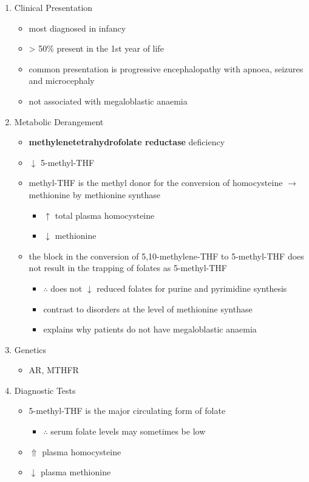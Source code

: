 \documentclass[12pt]{scrartcl}
\begin{document}
\begin{enumerate}
\item Clinical Presentation
\label{sec:org2fc5f35}
\begin{itemize}
\item most diagnosed in infancy
\item \textgreater{} 50\% present in the 1st year of life
\item common presentation is progressive encephalopathy with apnoea,
seizures and microcephaly
\item not associated with megaloblastic anaemia
\end{itemize}

\item Metabolic Derangement
\label{sec:orgcab1d4a}
\begin{itemize}
\item \textbf{methylenetetrahydrofolate reductase} deficiency
\end{itemize}
\begin{itemize}
\item \(\downarrow\) 5-methyl-THF
\item methyl-THF is the methyl donor for the conversion of homocysteine
\(\to\) methionine by methionine synthase
\begin{itemize}
\item \(\uparrow\) total plasma homocysteine
\item \(\downarrow\) methionine
\end{itemize}
\item the block in the conversion of 5,10-methylene-THF to 5-methyl-THF does not
result in the trapping of folates as 5-methyl-THF
\begin{itemize}
\item \(\therefore\) does not \(\downarrow\) reduced folates for purine and
pyrimidine synthesis
\item contrast to disorders at the level of methionine synthase
\item explains why patients do not have megaloblastic anaemia
\end{itemize}
\end{itemize}

\item Genetics
\label{sec:org835047e}
\begin{itemize}
\item AR, MTHFR
\end{itemize}

\item Diagnostic Tests
\label{sec:org97e2616}
\begin{itemize}
\item 5-methyl-THF is the major circulating form of folate
\begin{itemize}
\item \(\therefore\) serum folate levels may sometimes be low
\end{itemize}
\item \(\Uparrow\) plasma homocysteine
\item \(\downarrow\) plasma methionine
\end{itemize}


\end{enumerate}
\end{document}
